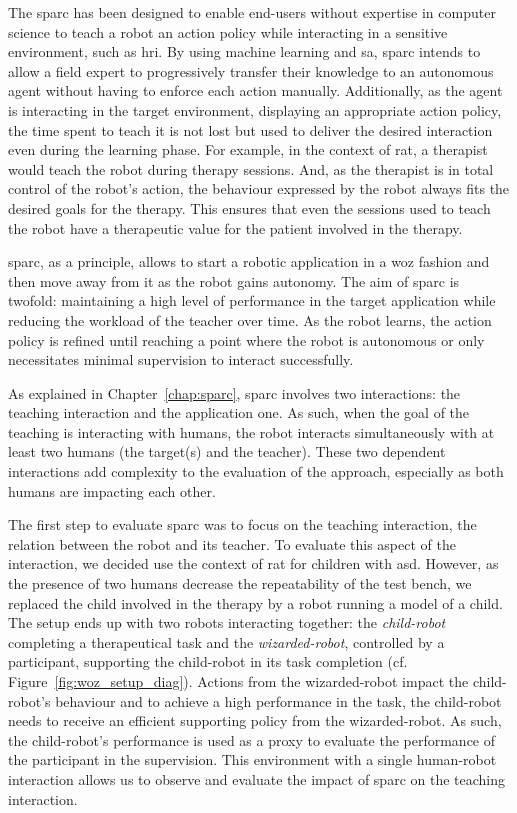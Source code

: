 The \gls{sparc} has been designed to enable end-users without expertise in computer science to teach a robot an action policy while interacting in a sensitive environment, such as \gls{hri}. By using machine learning and \gls{sa}, \gls{sparc} intends to allow a field expert to progressively transfer their knowledge to an autonomous agent without having to enforce each action manually. Additionally, as the agent is interacting in the target environment, displaying an appropriate action policy, the time spent to teach it is not lost but used to deliver the desired interaction even during the learning phase. For example, in the context of \gls{rat}, a therapist would teach the robot during therapy sessions. And, as the therapist is in total control of the robot's action, the behaviour expressed by the robot always fits the  desired goals for the therapy. This ensures that even the sessions used to teach the robot have a therapeutic value for the patient involved in the therapy.

\gls{sparc}, as a principle, allows to start a robotic application in a \gls{woz} fashion and then move away from it as the robot gains autonomy. The aim of \gls{sparc} is twofold: maintaining a high level of performance in the target application while reducing the workload of the teacher over time. As the robot learns, the action policy is refined until reaching a point where the robot is autonomous or only necessitates minimal supervision to interact successfully. 

As explained in Chapter~\ref{chap:sparc}, \gls{sparc} involves two interactions: the teaching interaction and the application one. As such, when the goal of the teaching is interacting with humans, the robot interacts simultaneously with at least two humans (the target(s) and the teacher). These two dependent interactions add complexity to the evaluation of the approach, especially as both humans are impacting each other. 

The first step to evaluate \gls{sparc} was to focus on the teaching interaction, the relation between the robot and its teacher. To evaluate this aspect of the interaction, we decided use the context of \gls{rat} for children with \gls{asd}. However, as the presence of two humans decrease the repeatability of the test bench, we replaced the child involved in the therapy by a robot running a model of a child. The setup ends up with two robots interacting together: the \emph{child-robot} completing a therapeutical task and the \emph{wizarded-robot}, controlled by a participant, supporting the child-robot in its task completion (cf. Figure~\ref{fig:woz_setup_diag}). Actions from the wizarded-robot impact the child-robot's behaviour and to achieve a high performance in the task, the child-robot needs to receive an efficient supporting policy from the wizarded-robot. As such, the child-robot's performance is used as a proxy to evaluate the performance of the participant in the supervision. This environment with a single human-robot interaction allows us to observe and evaluate the impact of \gls{sparc} on the teaching interaction.

